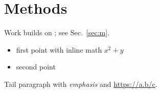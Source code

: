 \documentclass{article}
\begin{document}
\section{Methods}
Work \cite{knuth84} builds on \citep[see][p.~2]{lamport94}; see Sec.~\ref{sec:m}\label{sec:m}.
\begin{itemize}
\item first point with inline math $x^2 + y$
\item second point
\end{itemize}
Tail paragraph with \emph{emphasis} and \url{https://a.b/c}.
\end{document}
